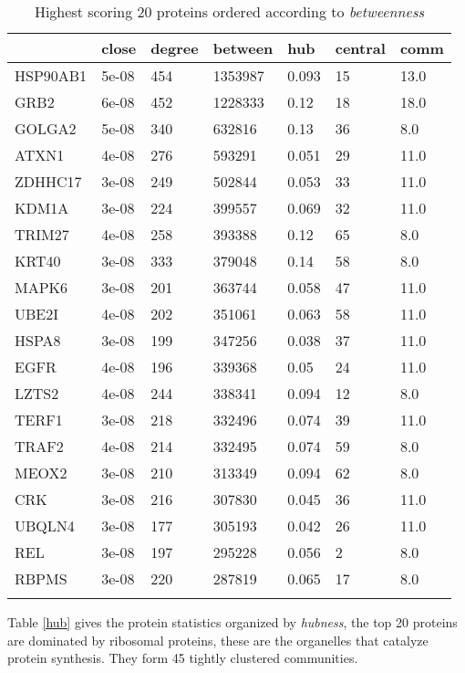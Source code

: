 \documentclass[a4paper,8pt,twocolumn,5p]{elsarticle}
\begin{document}
\begin{table}[ht]
\centering \scriptsize \caption{Highest scoring 20 proteins ordered according to {\it betweenness}}
\label{bet}
\begin{tabular}{lllllll}
  \hline
 & close & degree & between & hub & central & comm \\ 
  \hline
HSP90AB1 & 5e-08 & 454 & 1353987 & 0.093 & 15 & 13.0 \\ 
  GRB2 & 6e-08 & 452 & 1228333 & 0.12 & 18 & 18.0 \\ 
  GOLGA2 & 5e-08 & 340 & 632816 & 0.13 & 36 & 8.0 \\ 
  ATXN1 & 4e-08 & 276 & 593291 & 0.051 &  29 & 11.0 \\ 
  ZDHHC17 & 3e-08 & 249 & 502844 & 0.053 &  33 & 11.0 \\ 
  KDM1A & 3e-08 & 224 & 399557 & 0.069 & 32 & 11.0 \\ 
  TRIM27 & 4e-08 & 258 & 393388 & 0.12 & 65 & 8.0 \\ 
  KRT40 & 3e-08 & 333 & 379048 & 0.14 & 58 & 8.0 \\ 
  MAPK6 & 3e-08 & 201 & 363744 & 0.058 &  47 & 11.0 \\ 
  UBE2I & 4e-08 & 202 & 351061 & 0.063 &  58 & 11.0 \\ 
  HSPA8 & 3e-08 & 199 & 347256 & 0.038 & 37 & 11.0 \\ 
  EGFR & 4e-08 & 196 & 339368 & 0.05 &  24 & 11.0 \\ 
  LZTS2 & 4e-08 & 244 & 338341 & 0.094 &  12 & 8.0 \\ 
  TERF1 & 3e-08 & 218 & 332496 & 0.074 &  39 & 11.0 \\ 
  TRAF2 & 4e-08 & 214 & 332495 & 0.074 &  59 & 8.0 \\ 
  MEOX2 & 3e-08 & 210 & 313349 & 0.094 & 62 & 8.0 \\ 
  CRK & 3e-08 & 216 & 307830 & 0.045 &  36 & 11.0 \\ 
  UBQLN4 & 3e-08 & 177 & 305193 & 0.042 & 26 & 11.0 \\ 
  REL & 3e-08 & 197 & 295228 & 0.056 &   2 & 8.0 \\ 
  RBPMS & 3e-08 & 220 & 287819 & 0.065 & 17 & 8.0 \\ 
   \hline  \normalsize
\end{tabular}
\end{table}

Table \ref{hub} gives the protein statistics organized by {\it hubness}, the top 20 proteins are dominated by ribosomal proteins, these are the organelles that catalyze protein synthesis. They form 45 tightly clustered communities.
\end{document}
